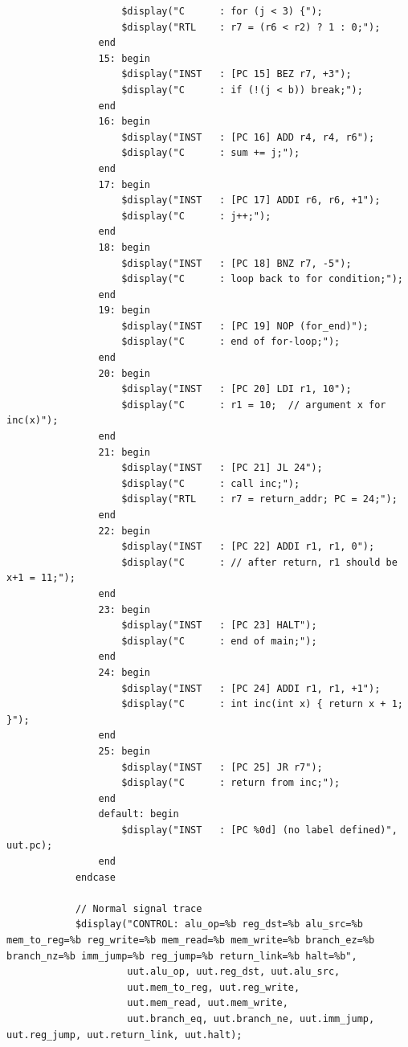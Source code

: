 \documentclass[12pt]{report}
\begin{document}
\begin{lstlisting}
                    $display("C      : for (j < 3) {");
                    $display("RTL    : r7 = (r6 < r2) ? 1 : 0;");
                end
                15: begin
                    $display("INST   : [PC 15] BEZ r7, +3");
                    $display("C      : if (!(j < b)) break;");
                end
                16: begin
                    $display("INST   : [PC 16] ADD r4, r4, r6");
                    $display("C      : sum += j;");
                end
                17: begin
                    $display("INST   : [PC 17] ADDI r6, r6, +1");
                    $display("C      : j++;");
                end
                18: begin
                    $display("INST   : [PC 18] BNZ r7, -5");
                    $display("C      : loop back to for condition;");
                end
                19: begin
                    $display("INST   : [PC 19] NOP (for_end)");
                    $display("C      : end of for-loop;");
                end
                20: begin
                    $display("INST   : [PC 20] LDI r1, 10");
                    $display("C      : r1 = 10;  // argument x for inc(x)");
                end
                21: begin
                    $display("INST   : [PC 21] JL 24");
                    $display("C      : call inc;");
                    $display("RTL    : r7 = return_addr; PC = 24;");
                end
                22: begin
                    $display("INST   : [PC 22] ADDI r1, r1, 0");
                    $display("C      : // after return, r1 should be x+1 = 11;");
                end
                23: begin
                    $display("INST   : [PC 23] HALT");
                    $display("C      : end of main;");
                end
                24: begin
                    $display("INST   : [PC 24] ADDI r1, r1, +1");
                    $display("C      : int inc(int x) { return x + 1; }");
                end
                25: begin
                    $display("INST   : [PC 25] JR r7");
                    $display("C      : return from inc;");
                end
                default: begin
                    $display("INST   : [PC %0d] (no label defined)", uut.pc);
                end
            endcase

            // Normal signal trace
            $display("CONTROL: alu_op=%b reg_dst=%b alu_src=%b mem_to_reg=%b reg_write=%b mem_read=%b mem_write=%b branch_ez=%b branch_nz=%b imm_jump=%b reg_jump=%b return_link=%b halt=%b",
                     uut.alu_op, uut.reg_dst, uut.alu_src,
                     uut.mem_to_reg, uut.reg_write,
                     uut.mem_read, uut.mem_write,
                     uut.branch_eq, uut.branch_ne, uut.imm_jump, uut.reg_jump, uut.return_link, uut.halt);


\end{lstlisting}
\end{document}

